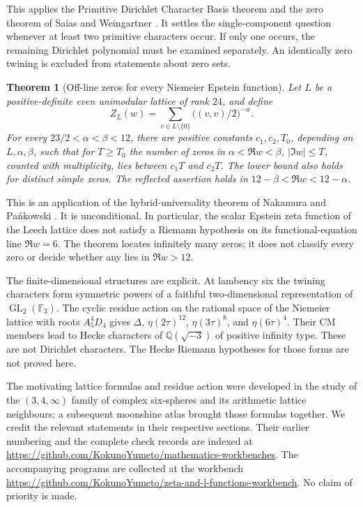 \documentclass[11pt]{amsart}
\newtheorem{theorem}{Theorem}[section]
\theoremstyle{definition}
\theoremstyle{remark}
\newcommand{\Q}{\mathbb Q}
\newcommand{\F}{\mathbb F}
\DeclareMathOperator{\GL}{GL}
\newcommand{\workbenchurl}{https://github.com/KokunoYumeto/zeta-and-l-functions-workbench}
\newcommand{\recordurl}{https://github.com/KokunoYumeto/mathematics-workbenches}
\begin{document}
This applies the Primitive Dirichlet Character Basis theorem
and the zero theorem of Saias and Weingartner \cite[pp.~335--336]{SW2009}.
It settles the single-component question whenever at least two primitive
characters occur. If only one occurs, the remaining Dirichlet polynomial
must be examined separately. An identically zero twining is excluded from
statements about zero sets.

\begin{theorem}[Off-line zeros for every Niemeier Epstein function]
\label{thm:intro-niemeier}
Let $L$ be a positive-definite even unimodular lattice of rank $24$,
and define
\[
 Z_L(w)=\sum_{v\in L\setminus\{0\}}
             \bigl((v,v)/2\bigr)^{-w}.
\]
For every $23/2<\alpha<\beta<12$, there are positive constants
$c_1,c_2,T_0$, depending on $L,\alpha,\beta$, such that for $T\geq T_0$
the number of zeros in
$\alpha<\Re w<\beta$, $|\Im w|\leq T$, counted with multiplicity,
lies between $c_1T$ and $c_2T$. The lower bound also holds for
distinct simple zeros. The reflected assertion holds in
$12-\beta<\Re w<12-\alpha$.
\end{theorem}

This is an application of the hybrid-universality theorem of
Nakamura and Pa\'nkowski \cite[Main Theorems~1--2 and Theorem~E,
pp.~4--5 of the preprint]{NP2016}. It is unconditional.
In particular, the scalar Epstein zeta function of the Leech lattice
does not satisfy a Riemann hypothesis on its functional-equation line
$\Re w=6$. The theorem locates infinitely many zeros; it does not
classify every zero or decide whether any lies in $\Re w>12$.

The finite-dimensional structures are explicit. At lambency six the
twining characters form symmetric powers of a faithful two-dimensional
representation of $\GL_2(\F_3)$. The cyclic residue action on the rational
space of the Niemeier lattice with roots $A_5^4D_4$ gives
$\Delta$, $\eta(2\tau)^{12}$, $\eta(3\tau)^8$, and $\eta(6\tau)^4$.
Their CM members lead to Hecke characters of $\Q(\sqrt{-3})$ of positive
infinity type. These are not Dirichlet characters. The Hecke Riemann
hypotheses for those forms are not proved here.

The motivating lattice formulas and residue action were developed in
the study of the $(3,4,\infty)$ family of complex six-spheres and its
arithmetic lattice neighbours; a subsequent moonshine atlas brought
those formulas together. We credit the relevant statements
in their respective sections. Their earlier numbering and the complete
check records are indexed at \url{\recordurl}. The accompanying programs
are collected at the workbench \url{\workbenchurl}.
No claim of priority is made.
\end{document}
